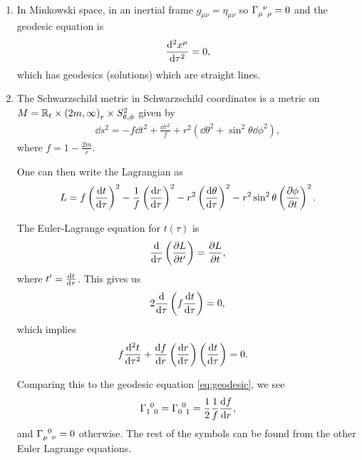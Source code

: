 \begin{examples}~
    \begin{enumerate}[label=\arabic*)]
        \item In Minkowski space, in an inertial frame $g_{\mu \nu} = \eta_{\mu \nu}$ so $\tensor{\Gamma}{_{\mu}^{\nu}_\rho} = 0$ and the geodesic equation is
            \begin{align}
                \dv[2]{x^{\mu}}{\tau} = 0
            ,\end{align}
            which has geodesics (solutions) which are straight lines.
        \item The Schwarzschild metric in Schwarzschild coordinates is a metric on $M = \mathbb{R}_t \times \left( 2m, \infty \right)_r \times S^2_{\theta, \phi} $ given by
            \begin{align}
                \dd{s}^2 = - f \dd{t}^2 + \frac{\dd{r}^2}{f} + r^2 \left( \dd{\theta}^2 + \sin^2 \theta \dd{\phi}^2 \right) 
            ,\end{align}
            where $f = 1 - \frac{2m}{r}$.

            One can then write the Lagrangian as
            \begin{align}
                L = f \left( \dv{t}{\tau} \right)^2 - \frac{1}{f} \left( \dv{r}{\tau} \right)^2 - r^2 \left( \dv{\theta}{\tau} \right)^2 - r^2 \sin^2 \theta \left( \pdv{\phi}{t} \right)^2
            .\end{align}

            The Euler-Lagrange equation for $t \left( \tau \right) $ is 
            \begin{align}
                \dv{\tau} \left( \pdv{L}{t'} \right) = \pdv{L}{t}
            ,\end{align}
            where $t' = \dv{t}{\tau}$. This gives us
            \begin{align}
                2 \dv{\tau} \left( f \dv{t}{\tau} \right) = 0
            ,\end{align}
            which implies
            \begin{align}
                f \dv[2]{t}{\tau} + \dv{f}{r} \left( \dv{r}{\tau} \right) \left( \dv{t}{\tau} \right)  &= 0
            .\end{align}

            Comparing this to the geodesic equation \cref{eq:geodesic}, we see
            \begin{align}
                \tensor{\Gamma}{_1^{0}_0} = \tensor{\Gamma}{_0^{0}_1} = \frac{1}{2} \frac{1}{f} \dv{f}{r}
            ,\end{align}
            and $\tensor{\Gamma}{_\mu^{0}_\nu} = 0$ otherwise. The rest of the symbols can be found from the other Euler Lagrange equations.
    \end{enumerate}
\end{examples}

